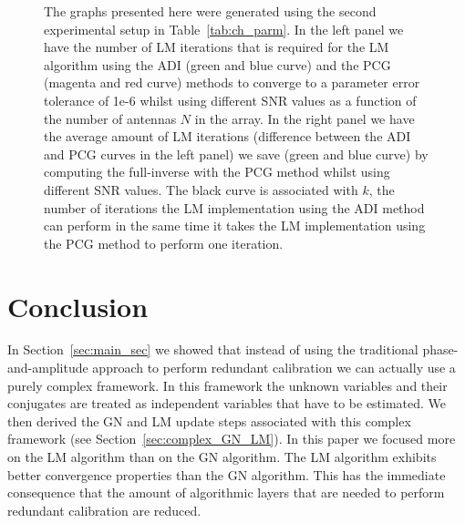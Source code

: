 \documentclass[useAMS,usenatbib]{mn2e}
\begin{document}
\begin{figure}
\centering
{}
\caption{The graphs presented here were generated using the second experimental setup in Table~\ref{tab:ch_parm}. In the left panel we have the number of LM iterations 
that is required for the LM algorithm using the ADI (green and blue curve) and the PCG (magenta and red curve) methods to converge to a parameter error tolerance of 1e-6 whilst using different 
SNR values as a function of the number of antennas $N$ in the array. In the right panel we have the average amount of LM iterations (difference between the ADI and PCG curves in the left panel) we save (green and blue curve) by computing the full-inverse with the PCG method whilst using different SNR values.
The black curve is associated with $k$, the number of iterations the LM implementation using the ADI method can perform in the same time it takes the LM implementation using 
the PCG method to perform one iteration.
\label{fig:out_diff}} 
\end{figure}

\section{Conclusion}
In Section~\ref{sec:main_sec} we showed that instead of using the traditional phase-and-amplitude approach to perform redundant calibration we can actually use a purely complex
framework. In this framework the unknown variables and their conjugates are treated as independent variables that have to be estimated. 
We then derived the GN and LM update steps associated with this complex framework (see Section~\ref{sec:complex_GN_LM}). In this paper we focused more on the LM algorithm than on the GN algorithm. The LM algorithm exhibits better convergence properties than the 
GN algorithm. This has the immediate consequence that the amount of algorithmic layers that are needed to perform redundant calibration are reduced.
\end{document}
